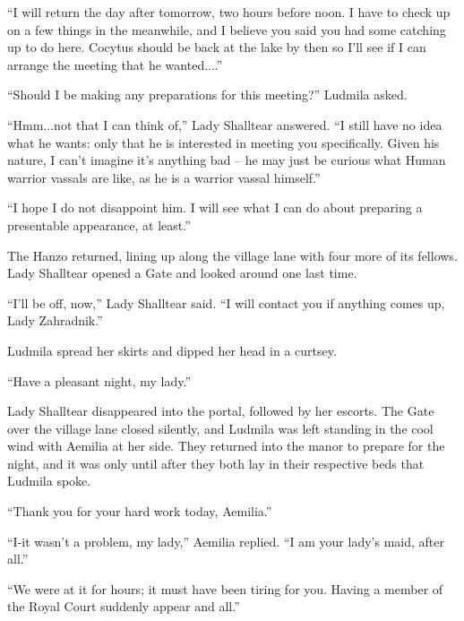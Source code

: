 “I will return the day after tomorrow, two hours before noon. I have to check up on a few things in the meanwhile, and I believe you said you had some catching up to do here. Cocytus should be back at the lake by then so I’ll see if I can arrange the meeting that he wanted....”

 

“Should I be making any preparations for this meeting?” Ludmila asked.

 

“Hmm...not that I can think of,” Lady Shalltear answered. “I still have no idea what he wants: only that he is interested in meeting you specifically. Given his nature, I can’t imagine it’s anything bad – he may just be curious what Human warrior vassals are like, as he is a warrior vassal himself.”

 

“I hope I do not disappoint him. I will see what I can do about preparing a presentable appearance, at least.”

 

The Hanzo returned, lining up along the village lane with four more of its fellows. Lady Shalltear opened a Gate and looked around one last time.

 

“I’ll be off, now,” Lady Shalltear said. “I will contact you if anything comes up, Lady Zahradnik.”

 

Ludmila spread her skirts and dipped her head in a curtsey.

 

“Have a pleasant night, my lady.”

 

Lady Shalltear disappeared into the portal, followed by her escorts. The Gate over the village lane closed silently, and Ludmila was left standing in the cool wind with Aemilia at her side. They returned into the manor to prepare for the night, and it was only until after they both lay in their respective beds that Ludmila spoke.

 

“Thank you for your hard work today, Aemilia.”

 

“I-it wasn’t a problem, my lady,” Aemilia replied. “I am your lady’s maid, after all.”

 

“We were at it for hours; it must have been tiring for you. Having a member of the Royal Court suddenly appear and all.”

